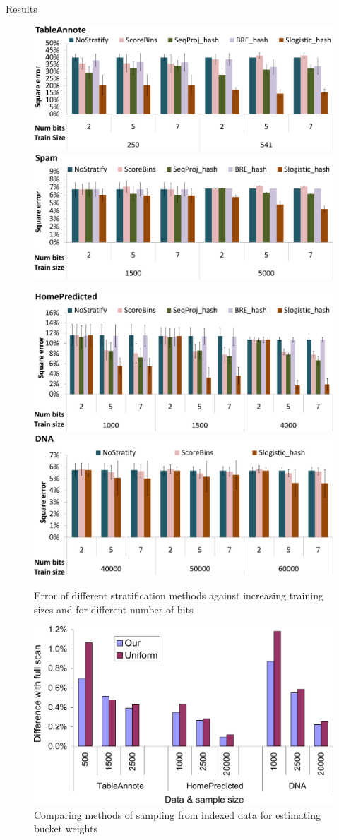 \documentclass[11pt]{beamer}
\begin{document}
\begin{frame}[allowframebreaks]{Results}
\begin{center}
\framebreak

\begin{figure}
\includegraphics[width=0.5\hsize]{figs/e2tableannote_crop}
\includegraphics[width=0.5\hsize]{figs/e2spam_crop}
\end{figure}
\begin{figure}
\includegraphics[width=0.5\hsize]{figs/e2homepredicted_crop}
\includegraphics[width=0.5\hsize]{figs/e2dna_crop}
\caption{Error of different stratification methods against increasing
  training sizes and for different number of bits}
\end{figure}
\end{center}

\framebreak

\begin{figure}
\begin{center}
\includegraphics[width=0.85\hsize]{figs/allDataWts-crop}
\caption{Comparing methods of sampling from indexed data for
  estimating bucket weights}
\label{fig:allWts}
\end{center}
\end{figure}

\end{frame}
\end{document}
